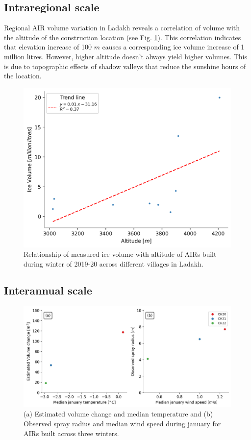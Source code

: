 \subsection{Intraregional scale}

Regional AIR volume variation in Ladakh reveals a correlation of volume with the altitude of the construction
location (see Fig. \ref{fig:altvsvol}). This correlation indicates that elevation increase of 100 $m$ causes a
corresponding ice volume increase of 1 million litres. However, higher altitude doesn't always yield higher
volumes. This is due to topographic effects of shadow valleys that reduce the sunshine hours of the location.

\begin{figure}[htb]
\centering
\includegraphics[width=12cm]{figs/altitudevsvolume.png}
\caption{Relationship of measured ice volume with altitude of AIRs built during winter of 2019-20 across
different villages in Ladakh.  }
\label{fig:altvsvol}
\end{figure}

\subsection{Interannual scale}

\begin{figure}[htb]
\centering
\includegraphics[width=\textwidth]{figs/CH_diffs.jpg}
\caption{(a) Estimated volume change and median temperature and (b) Observed spray radius and median wind speed
during january for AIRs built across three winters. } 
\label{fig:CH_diffs}
\end{figure}

